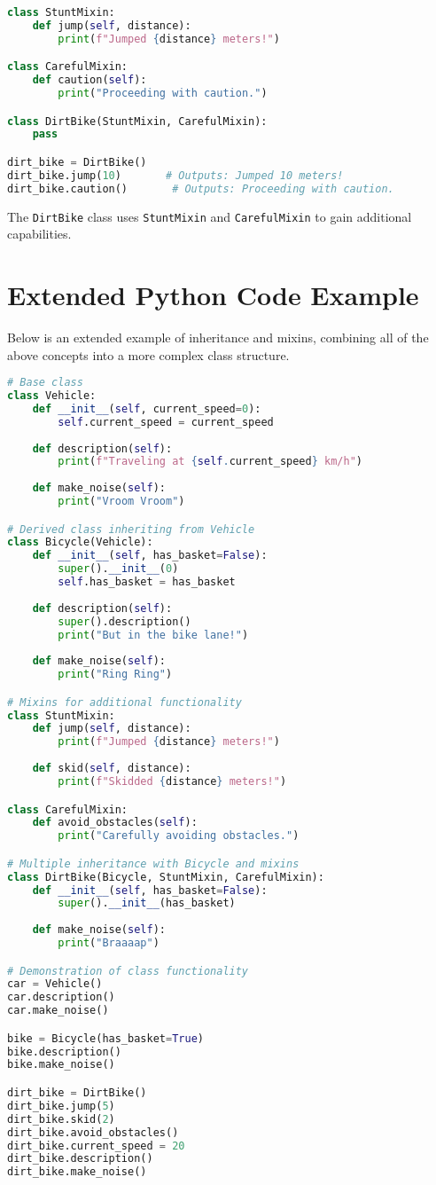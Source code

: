 \documentclass{article}
\begin{document}
\begin{lstlisting}[language=Python]
class StuntMixin:
    def jump(self, distance):
        print(f"Jumped {distance} meters!")

class CarefulMixin:
    def caution(self):
        print("Proceeding with caution.")

class DirtBike(StuntMixin, CarefulMixin):
    pass

dirt_bike = DirtBike()
dirt_bike.jump(10)       # Outputs: Jumped 10 meters!
dirt_bike.caution()       # Outputs: Proceeding with caution.
\end{lstlisting}

The \texttt{DirtBike} class uses \texttt{StuntMixin} and \texttt{CarefulMixin} to gain additional capabilities.


\section{Extended Python Code Example}
Below is an extended example of inheritance and mixins, combining all of the above concepts into a more complex class structure.

\begin{lstlisting}[language=Python]
# Base class
class Vehicle:
    def __init__(self, current_speed=0):
        self.current_speed = current_speed
    
    def description(self):
        print(f"Traveling at {self.current_speed} km/h")
    
    def make_noise(self):
        print("Vroom Vroom")

# Derived class inheriting from Vehicle
class Bicycle(Vehicle):
    def __init__(self, has_basket=False):
        super().__init__(0)
        self.has_basket = has_basket
    
    def description(self):
        super().description()
        print("But in the bike lane!")
    
    def make_noise(self):
        print("Ring Ring")

# Mixins for additional functionality
class StuntMixin:
    def jump(self, distance):
        print(f"Jumped {distance} meters!")
    
    def skid(self, distance):
        print(f"Skidded {distance} meters!")

class CarefulMixin:
    def avoid_obstacles(self):
        print("Carefully avoiding obstacles.")

# Multiple inheritance with Bicycle and mixins
class DirtBike(Bicycle, StuntMixin, CarefulMixin):
    def __init__(self, has_basket=False):
        super().__init__(has_basket)
    
    def make_noise(self):
        print("Braaaap")

# Demonstration of class functionality
car = Vehicle()
car.description()
car.make_noise()

bike = Bicycle(has_basket=True)
bike.description()
bike.make_noise()

dirt_bike = DirtBike()
dirt_bike.jump(5)
dirt_bike.skid(2)
dirt_bike.avoid_obstacles()
dirt_bike.current_speed = 20
dirt_bike.description()
dirt_bike.make_noise()
\end{lstlisting}
\end{document}
